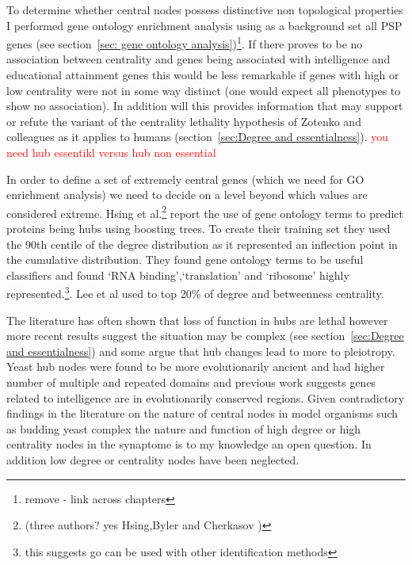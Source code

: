 To determine whether central nodes possess distinctive non topological properties I performed gene ontology enrichment analysis using as a background set all PSP genes (see section~\ref{sec: gene ontology analysis})\footnote{remove - link across chapters}. If there proves to be no association between centrality and genes being associated with intelligence and educational attainment genes this would be less remarkable if genes with high or low centrality were not in some way distinct (one would expect all phenotypes to show no association). In addition will this provides information that may support or refute the variant of the centrality lethality hypothesis of Zotenko and colleagues \cite{zotenko2008hubs} as it applies to humans (section~\ref{sec:Degree and essentialness}). \textcolor{red}{you need hub essentikl versus hub non essential}


In order to define a set of extremely central genes (which we need for GO enrichment analysis) we need to decide on a level beyond which values are considered extreme. Hsing et al.\cite{hsing2008use}\footnote{(three authors? yes Hsing,Byler and Cherkasov )} report the use of gene ontology terms to predict proteins being hubs using boosting trees. To create their training set they used the 90th centile of the degree distribution as it represented an inflection point in the cumulative distribution. They found gene ontology terms to be useful classifiers and found `RNA binding',`translation' and `ribosome' highly represented.\footnote{this suggests go can be used with other identification methods}. Lee et al\cite{lee2013network} used to top 20\% of degree and betweenness centrality. 

The literature has often shown that loss of function in hubs are lethal \cite{jeong2001lethality} however more recent results suggest the situation may be complex (see section~\ref{sec:Degree and essentialness}) and some argue that hub changes lead to more to pleiotropy\cite{yu2008high}. Yeast hub nodes were found to be more evolutionarily ancient and had higher number of multiple and repeated domains\cite{ekman2006properties} and previous work suggests genes related to intelligence are in evolutionarily conserved regions\cite{hill2016molecular}. Given contradictory findings in the literature on the nature of central nodes in model organisms such as budding yeast complex the nature and function of high degree or high centrality nodes in the synaptome is to my knowledge an open question. In addition low degree or centrality nodes have been neglected.


